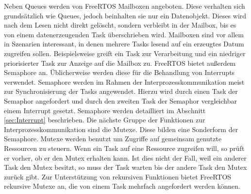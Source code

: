 Neben Queues werden von FreeRTOS Mailboxen angeboten. Diese verhalten sich grund\-sätz\-lich wie Queues, jedoch beinhalten sie nur ein Datenobjekt. Dieses wird nach dem Lesen nicht direkt gelöscht, sondern verbleibt in der Mailbox, bis es von einem datenerzeugenden Task über\-schrie\-ben wird. Mailboxen sind vor allem in Szenarien interessant, in denen mehrere Tasks lesend auf ein erzeugtes Datum zugreifen sollen. Beispielsweise greift ein Task zur Verarbeitung und ein niedriger priorisierter Task zur Anzeige auf die Mailbox zu.
\newline
FreeRTOS bietet außerdem Semaphore an. Üblicherweise werden diese für die Behandlung von Interrupts verwendet. Semaphore werden im Rahmen der Interprozesskommunikation meist zur Synchronisierung der Tasks angewendet. 
Hierzu wird durch einen Task der Semaphor angefordert und durch den zweiten Task der Semaphor vergleichbar einem Interrupt gesetzt. Semaphore werden detailliert im Abschnitt \ref{sec:Interrupt} beschrieben.
\newline
Die nächste Gruppe der Funktionen zur Interprozesskommunikation sind die Mutexe. Diese bilden eine Sonderform der Semaphore. 
Mutexe werden benutzt um Zugriffe auf gemeinsam genutzte Ressourcen zu steuern. Wenn ein Task auf eine Ressource zugreifen will, so prüft er vorher, ob er den Mutex erhalten kann. Ist dies nicht der Fall, weil ein anderer Task den Mutex besitzt, so muss der Task warten bis der andere Task den Mutex zurück gibt. Zur Unterstützung von rekursiven Funktionen bietet FreeRTOS rekursive Mutexe an, die von einem Task mehrfach angefordert werden können. 

